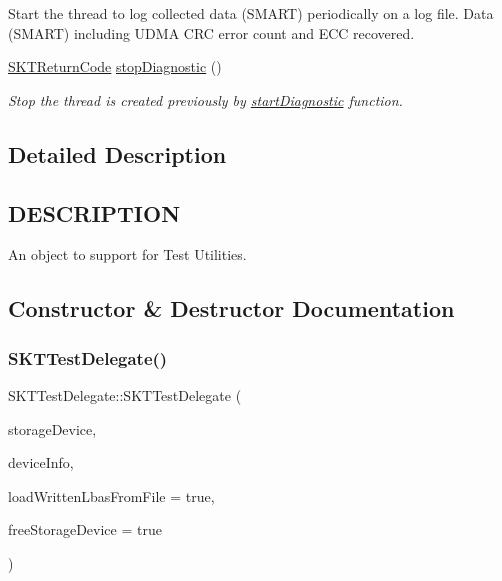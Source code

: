 \begin{DoxyCompactItemize}
\begin{DoxyCompactList}
Start the thread to log collected data (S\+M\+A\+RT) periodically on a log file. Data (S\+M\+A\+RT) including U\+D\+MA C\+RC error count and E\+CC recovered. \end{DoxyCompactList}\item 
\mbox{\hyperlink{_storage_kit_test_delegate_8h_a143844aea21c1ac420c1d0307a69deb7}{S\+K\+T\+Return\+Code}} \mbox{\hyperlink{class_s_k_t_test_delegate_a83eb8f0f40e0ba07f93bcc2bfbe3b14f}{stop\+Diagnostic}} ()
\begin{DoxyCompactList}\small\item\em Stop the thread is created previously by \mbox{\hyperlink{class_s_k_t_test_delegate_a90d0c168749430e20f9bee211adc20da}{start\+Diagnostic}} function. \end{DoxyCompactList}\end{DoxyCompactItemize}


\subsection{Detailed Description}
\hypertarget{class_s_k_t_test_delegate_factory_DESCRIPTION}{}\subsection{D\+E\+S\+C\+R\+I\+P\+T\+I\+ON}\label{class_s_k_t_test_delegate_factory_DESCRIPTION}
An object to support for Test Utilities. 

\subsection{Constructor \& Destructor Documentation}
\mbox{\label{class_s_k_t_test_delegate_aecc4032aaee08b7c6f8eb4b5d21c1816}} 
\subsubsection{\texorpdfstring{SKTTestDelegate()}{SKTTestDelegate()}}
{\footnotesize\ttfamily S\+K\+T\+Test\+Delegate\+::\+S\+K\+T\+Test\+Delegate (\begin{DoxyParamCaption}\item[{S\+K\+Storage\+Device $\ast$}]{storage\+Device,  }\item[{S\+K\+Device\+Info $\ast$}]{device\+Info,  }\item[{bool}]{load\+Written\+Lbas\+From\+File = {\ttfamily true},  }\item[{bool}]{free\+Storage\+Device = {\ttfamily true} }\end{DoxyParamCaption})}



